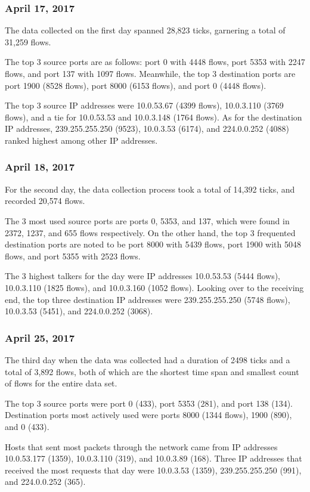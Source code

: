 \documentclass[journal]{IEEE/IEEEtran}
\begin{document}
\subsubsection{\textbf{April 17, 2017}}
The data collected on the first day spanned 28,823 ticks, garnering a total of 31,259 flows.

The top 3 source ports are as follows: port 0 with 4448 flows, port 5353 with 2247 flows, and port 137 with 1097 flows. Meanwhile, the top 3 destination ports are port 1900 (8528 flows), port 8000 (6153 flows), and port 0 (4448 flows).

The top 3 source IP addresses were 10.0.53.67 (4399 flows), 10.0.3.110 (3769 flows), and a tie for 10.0.53.53 and 10.0.3.148 (1764 flows). As for the destination IP addresses, 239.255.255.250 (9523), 10.0.3.53 (6174), and 224.0.0.252 (4088) ranked highest among other IP addresses.

\subsubsection{\textbf{April 18, 2017}}
For the second day, the data collection process took a total of 14,392 ticks, and recorded 20,574 flows.

The 3 most used source ports are ports 0, 5353, and 137, which were found in 2372, 1237, and 655 flows respectively. On the other hand, the top 3 frequented destination ports are noted to be port 8000 with 5439 flows, port 1900 with 5048 flows, and port 5355 with 2523 flows.

The 3 highest talkers for the day were IP addresses 10.0.53.53 (5444 flows), 10.0.3.110 (1825 flows), and 10.0.3.160 (1052 flows). Looking over to the receiving end, the top three destination IP addresses were 239.255.255.250 (5748 flows), 10.0.3.53 (5451), and 224.0.0.252 (3068).

\subsubsection{\textbf{April 25, 2017}}
The third day when the data was collected had a duration of 2498 ticks and a total of 3,892 flows, both of which are the shortest time span and smallest count of flows for the entire data set.

The top 3 source ports were port 0 (433), port 5353 (281), and port 138 (134). Destination ports most actively used were ports 8000 (1344 flows), 1900 (890), and 0 (433).

Hosts that sent most packets through the network came from IP addresses 10.0.53.177 (1359), 10.0.3.110 (319), and 10.0.3.89 (168). Three IP addresses that received the most requests that day were 10.0.3.53 (1359), 239.255.255.250 (991), and 224.0.0.252 (365).
\end{document}
